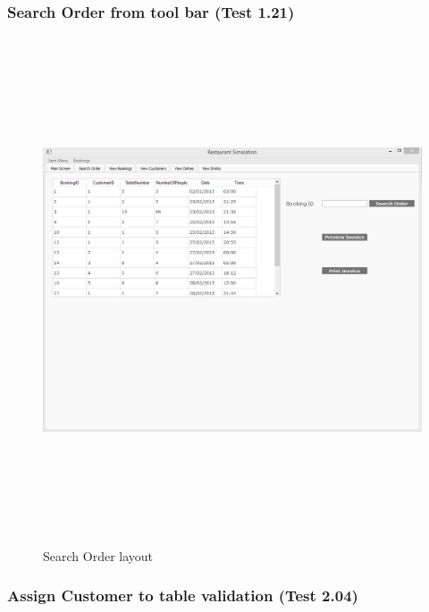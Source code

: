 \begin{landscape}


\subsubsection{Search Order from tool bar (Test 1.21)}

\begin{figure}[H]
    \includegraphics[height = 15cm]{./Maintenance/images/png/screen17}
    \caption{Search Order layout} \label{fig:searchOrder}
\end{figure}

\subsubsection{Assign Customer to table validation (Test 2.04)}


\end{landscape}
